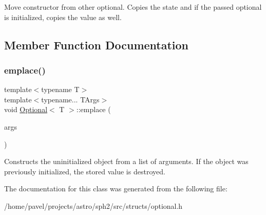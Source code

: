 Move constructor from other optional. Copies the state and if the passed optional is initialized, copies the value as well. 

\subsection{Member Function Documentation}
\hypertarget{classOptional_a2e0236b5bd0e4877d7db446cf0bb784e}{}\label{classOptional_a2e0236b5bd0e4877d7db446cf0bb784e} 
\subsubsection{\texorpdfstring{emplace()}{emplace()}}
{\footnotesize\ttfamily template$<$typename T$>$ \\
template$<$typename... T\+Args$>$ \\
void \hyperlink{classOptional}{Optional}$<$ T $>$\+::emplace (\begin{DoxyParamCaption}\item[{T\+Args \&\&...}]{args }\end{DoxyParamCaption})\hspace{0.3cm}{\ttfamily [inline]}}

Constructs the uninitialized object from a list of arguments. If the object was previously initialized, the stored value is destroyed. 

The documentation for this class was generated from the following file\+:\begin{DoxyCompactItemize}
\item 
/home/pavel/projects/astro/sph2/src/structs/optional.\+h\end{DoxyCompactItemize}
